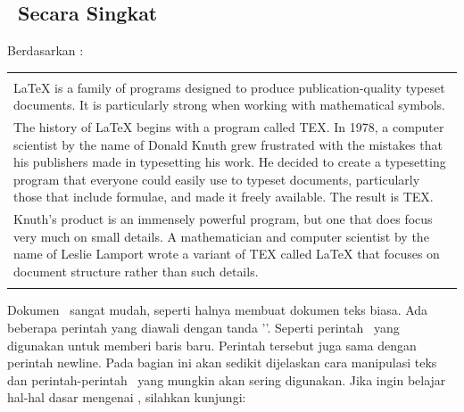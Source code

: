 \chapter{\babDua}

\section{\latex~Secara Singkat}
Berdasarkan \cite{latex.intro}: \\ 
\begin{tabular}{| p{13cm} |}
	\hline 
	\\
	LaTeX is a family of programs designed to produce publication-quality 
	typeset documents. It is particularly strong when working with 
	mathematical symbols. \\	
	The history of LaTeX begins with a program called TEX. In 1978, a 
	computer scientist by the name of Donald Knuth grew frustrated with the 
	mistakes that his publishers made in typesetting his work. He decided 
	to create a typesetting program that everyone could easily use to 
	typeset documents, particularly those that include formulae, and made 
	it freely available. The result is TEX. \\	
	Knuth's product is an immensely powerful program, but one that does 
	focus very much on small details. A mathematician and computer 
	scientist by the name of Leslie Lamport wrote a variant of TEX called 
	LaTeX that focuses on document structure rather than such details. \\
	\\
	\hline
\end{tabular}

\vspace*{0.8cm}

Dokumen \latex~sangat mudah, seperti halnya membuat dokumen teks biasa. Ada 
beberapa perintah yang diawali dengan tanda '\bslash'. 
Seperti perintah \bslash\bslash~yang digunakan untuk memberi baris baru. 
Perintah tersebut juga sama dengan perintah \bslash newline. 
Pada bagian ini akan sedikit dijelaskan cara manipulasi teks dan 
perintah-perintah \latex~yang mungkin akan sering digunakan. 
Jika ingin belajar hal-hal dasar mengenai \latex, silahkan kunjungi: 

